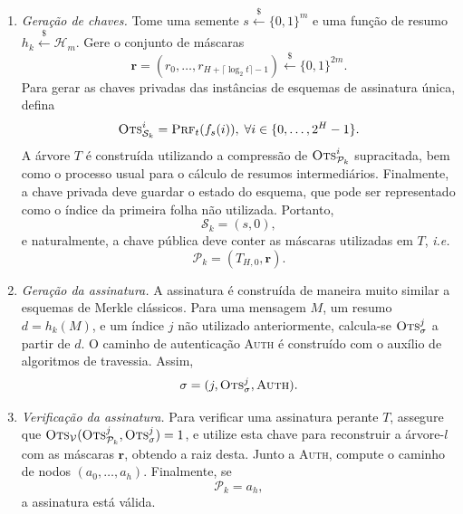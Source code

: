 \documentclass{ufsctex/ufsctex}
\newcommand{\hh}{\mathcal{H}}
\newcommand{\pk}{\mathcal{P}_k}
\newcommand{\sk}{\mathcal{S}_k}
\newcommand{\binwds}[1]{\{0, 1\}^{#1}}
\newcommand{\random}{\stackrel{\$}{\longleftarrow}}
\begin{document}
\begin{enumerate}

  \item[] \emph{Geração de chaves.} Tome uma semente $s
      \random{} \binwds{m}$ e uma função de resumo $h_k
        \random{} \hh{}_m$. Gere o conjunto de máscaras
      \begin{equation}
        \mathbf{r} = (r_0, \dots, r_{H + \lceil \log_{2} t \rceil - 1})
          \random{} \binwds{2m}.
      \end{equation}
        Para gerar as chaves privadas das instâncias de esquemas de assinatura
        única, defina
        \begin{equation}
          \textsc{Ots}_{\sk{}}^{i}
            = \textsc{Prf}_t(f_s(i)), \; \forall i \in \{0, \dots, 2^H - 1\}.
        \end{equation}
        A árvore $T$ é construída
        utilizando a compressão de $\textsc{Ots}_{\pk{}}^{i}$ supracitada, bem
        como o processo usual para o cálculo de resumos intermediários.
        Finalmente, a chave privada deve guardar o estado do esquema, que pode
        ser representado como o índice da primeira folha não utilizada.
        Portanto,
        \begin{equation}
          \sk{} = (s, 0),
        \end{equation}
        e naturalmente, a chave pública deve conter as máscaras utilizadas
        em $T$, \emph{i.e.}
        \begin{equation}
          \pk{} = (T_{H,0}, \mathbf{r}).
        \end{equation}

  \item[] \emph{Geração da assinatura.} A assinatura é construída de maneira
      muito similar a esquemas de Merkle clássicos. Para uma mensagem $M$, um
        resumo $d = h_k(M)$, e um índice $j$ não utilizado anteriormente,
        calcula-se $\textsc{Ots}_\sigma^{j}$ a partir de $d$. O caminho de
        autenticação \textsc{Auth} é construído com o auxílio de algoritmos de
        travessia. Assim,
        \begin{equation}
          \sigma = (j, \textsc{Ots}_\sigma^{j}, \textsc{Auth}).
        \end{equation}

  \item[] \emph{Verificação da assinatura.} Para verificar uma assinatura
      perante $T$, assegure que
        $\textsc{Ots}_{\mathcal{V}}(\textsc{Ots}_{\pk{}}^{j},
        \textsc{Ots}_{\sigma}^{j}) = 1$, e utilize esta chave para reconstruir
        a árvore-$l$ com as máscaras $\mathbf{r}$, obtendo a raiz desta. Junto
        a \textsc{Auth}, compute o caminho de nodos $(a_0, \dots, a_h)$.
        Finalmente, se
      \begin{equation}
        \pk{} = a_{h},
      \end{equation}
        a assinatura está válida.

\end{enumerate}
\end{document}

